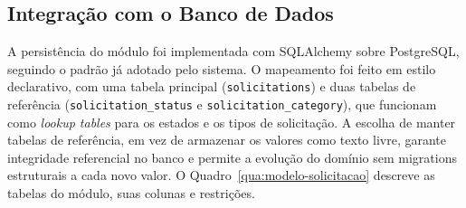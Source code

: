 \subsection{Integração com o Banco de Dados}
\label{sec:banco-dados}

A persistência do módulo foi implementada com SQLAlchemy sobre PostgreSQL, 
seguindo o padrão já adotado pelo sistema. O mapeamento foi feito em estilo 
declarativo, com uma tabela principal (\texttt{solicitations}) e duas tabelas 
de referência (\texttt{solicitation\_status} e \texttt{solicitation\_category}), 
que funcionam como \textit{lookup tables} para os estados e os tipos de 
solicitação. A escolha de manter tabelas de referência, em vez de armazenar 
os valores como texto livre, garante integridade referencial no banco e 
permite a evolução do domínio sem migrations estruturais a cada novo valor.
O Quadro~\ref{qua:modelo-solicitacao} descreve as tabelas do módulo, suas 
colunas e restrições.

